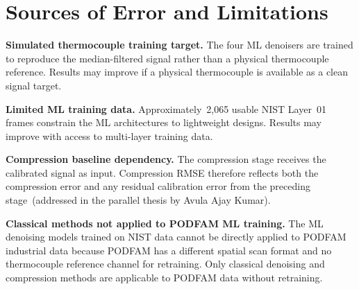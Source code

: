 \section{Sources of Error and Limitations}
\label{sec:limitations-ch3}

\textbf{Simulated thermocouple training target.} The four ML denoisers are trained to reproduce the median-filtered signal rather than a physical thermocouple reference. Results may improve if a physical thermocouple is available as a clean signal target.

\textbf{Limited ML training data.} Approximately~2,065 usable NIST Layer~01 frames constrain the ML architectures to lightweight designs. Results may improve with access to multi-layer training data.

\textbf{Compression baseline dependency.} The compression stage receives the calibrated signal as input. Compression RMSE therefore reflects both the compression error and any residual calibration error from the preceding stage~(addressed in the parallel thesis by Avula Ajay Kumar).

\textbf{Classical methods not applied to PODFAM ML training.} The ML denoising models trained on NIST data cannot be directly applied to PODFAM industrial data because PODFAM has a different spatial scan format and no thermocouple reference channel for retraining. Only classical denoising and compression methods are applicable to PODFAM data without retraining.

\let\cleardoublepage\clearpage
